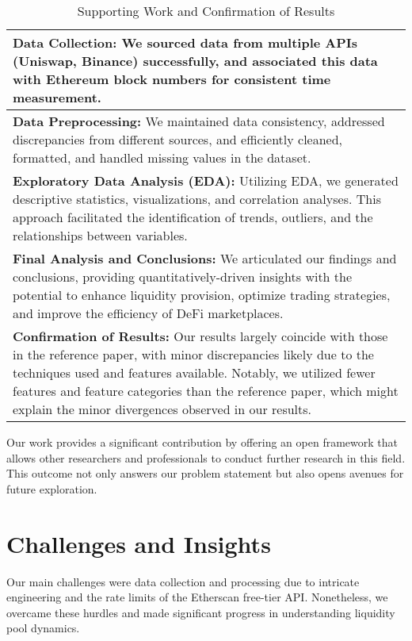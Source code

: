 \documentclass{article}
\begin{document}
{\begin{table}[htbp]
\centering
\small
\begin{tabularx}{\linewidth}{|>{\raggedright\arraybackslash}X|}
\hline
\textbf{Data Collection:} We sourced data from multiple APIs (Uniswap, Binance) successfully, and associated this data with Ethereum block numbers for consistent time measurement. \\
\hline
\textbf{Data Preprocessing:} We maintained data consistency, addressed discrepancies from different sources, and efficiently cleaned, formatted, and handled missing values in the dataset. \\
\hline
\textbf{Exploratory Data Analysis (EDA):} Utilizing EDA, we generated descriptive statistics, visualizations, and correlation analyses. This approach facilitated the identification of trends, outliers, and the relationships between variables. \\
\hline
\textbf{Final Analysis and Conclusions:} We articulated our findings and conclusions, providing quantitatively-driven insights with the potential to enhance liquidity provision, optimize trading strategies, and improve the efficiency of DeFi marketplaces. \\
\hline
\textbf{Confirmation of Results:} Our results largely coincide with those in the reference paper, with minor discrepancies likely due to the techniques used and features available. Notably, we utilized fewer features and feature categories than the reference paper, which might explain the minor divergences observed in our results. \\
\hline
\end{tabularx}
\caption{Supporting Work and Confirmation of Results}
\label{fig:approach-accomplishments}
\end{table}

Our work provides a significant contribution by offering an open framework that allows other researchers and professionals to conduct further research in this field. This outcome not only answers our problem statement but also opens avenues for future exploration.

\section*{Challenges and Insights}

Our main challenges were data collection and processing due to intricate engineering and the rate limits of the Etherscan free-tier API. Nonetheless, we overcame these hurdles and made significant progress in understanding liquidity pool dynamics.

}
\end{document}
